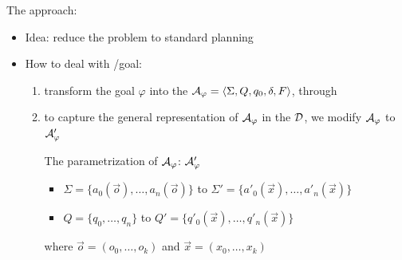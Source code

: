 \documentclass[10pt]{beamer}
\newcounter{saveenumi}
\newcommand{\seti}{\setcounter{saveenumi}{\value{enumi}}}
\begin{document}
\begin{frame}{The \FONDFOR approach:}
\begin{itemize}
\item Idea: reduce the problem to standard \FOND planning
\item How to deal with \LTLf/\PLTL goal:
\begin{enumerate}
\item transform the goal $\varphi$ into the \DFA $\mathcal{A}_\varphi = \langle \Sigma, Q, q_0 , \delta, F \rangle$, through \LTLfToDFA
\item to capture the general representation of $\mathcal{A}_\varphi$ in the $\mathcal{D}$, we modify $\mathcal{A}_\varphi$ to $\mathcal{A}'_\varphi$
\begin{block}{\normalsize The parametrization of $\mathcal{A}_\varphi$: $\mathcal{A}'_\varphi$}
\begin{itemize}
\item $\Sigma = \{a_0(\vec{o}), \dots, a_n(\vec{o})\}$ to $\Sigma' = \{a'_0(\vec{x}), \dots, a'_n(\vec{x})\}$
\item $Q = \{q_0, \dots, q_n\}$ to $Q' = \{q'_0(\vec{x}), \dots, q'_n(\vec{x})\}$
\end{itemize}
where $\vec{o} = (o_0,\dots,o_k)$ and $\vec{x} = (x_0,\dots,x_k)$ 
\end{block}
\seti

\end{enumerate}
\end{itemize}


%
%

\end{frame}
\end{document}
